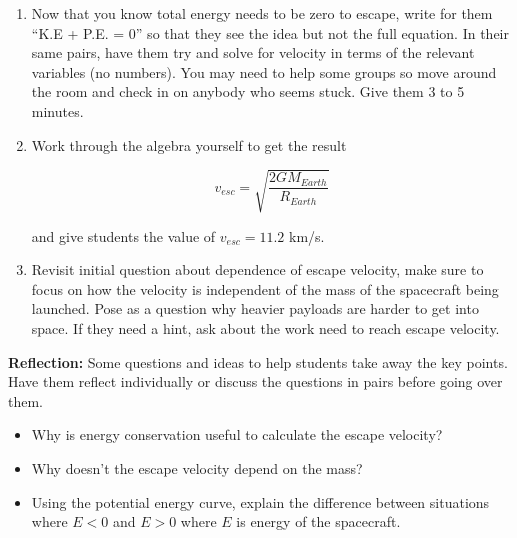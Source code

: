 \documentclass{article}
\begin{document}
\begin{enumerate}
\item Now that you know total energy needs to be zero to escape, write for them ``K.E + P.E. = 0'' so that they see the idea but not the full equation. In their same pairs, have them try and solve for velocity in terms of the relevant variables (no numbers). You may need to help some groups so move around the room and check in on anybody who seems stuck. Give them 3 to 5 minutes.

\item Work through the algebra yourself to get the result

\begin{equation}
v_{esc} = \sqrt{\frac{2 G M_{Earth}}{R_{Earth}}}
\end{equation}

and give students the value of $v_{esc} = 11.2$ km/s.

\item Revisit initial question about dependence of escape velocity, make sure to focus on how the velocity is independent of the mass of the spacecraft being launched. Pose as a question why heavier payloads are harder to get into space. If they need a hint, ask about the work need to reach escape velocity. 
\end{enumerate}

\textbf{Reflection:} Some questions and ideas to help students take away the key points. Have them reflect individually or discuss the questions in pairs before going over them. 

\begin{itemize}
\item Why is energy conservation useful to calculate the escape velocity?
\item Why doesn't the escape velocity depend on the mass?
\item Using the potential energy curve, explain the difference between situations where $E < 0$ and $E > 0$ where $E$ is energy of the spacecraft.
\end{itemize}

\end{document}
